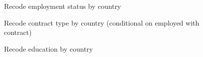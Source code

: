 \begin{figure}
    \caption{Recode employment status by country}
    \label{graph_descriptives_emp_status}
\end{figure}

\begin{figure}
    \caption{Recode contract type by country (conditional on employed with contract)}
    \label{graph_descriptives_contyp}
\end{figure}

\begin{figure}
    \caption{Recode education by country}
    \label{graph_descriptives_education}
\end{figure}


